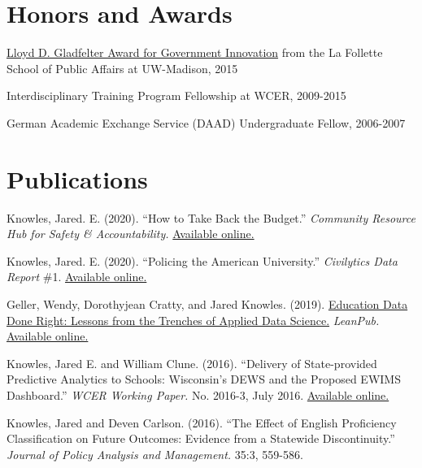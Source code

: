 \documentclass[margin,line]{res}
\begin{document}
\begin{resume}
\section{\sc Honors and Awards} 

\href{https://www.lafollette.wisc.edu/news/2015-gladfelter-winners-announced}{Lloyd D. Gladfelter Award for Government Innovation} from the La Follette School of Public Affairs at UW-Madison, 2015

\vspace*{-2.5mm}

Interdisciplinary Training Program Fellowship at WCER, 2009-2015

\vspace*{-2.5mm}

German Academic Exchange Service (DAAD) Undergraduate Fellow, 2006-2007



\section{\sc Publications}

Knowles, Jared. E. (2020). ``How to Take Back the Budget.'' \emph{Community Resource 
Hub for Safety \& Accountability.} \href{https://communityresourcehub.org/resources/how-to-take-back-the-budget/}{Available online.}

Knowles, Jared. E. (2020). ``Policing the American University.'' \emph{Civilytics 
Data Report} \#1. \href{https://www.civilytics.com/publication/cpd-report/}{Available online.}

Geller, Wendy, Dorothyjean Cratty, and Jared Knowles. (2019). \uline{Education Data Done Right: Lessons from the Trenches of Applied Data Science.} \emph{LeanPub.} 
\href{https://www.eddatadoneright.com}{Available online.}

Knowles, Jared E. and William Clune. (2016). ``Delivery of State-provided Predictive
Analytics to Schools: Wisconsin’s DEWS and the Proposed EWIMS Dashboard.'' 
\emph{WCER Working Paper.} No. 2016-3, July 2016. \href{https://wcer-web.ad.education.wisc.edu/docs/working-papers/Working_Paper_No_2016_03.pdf}{Available online.}

Knowles, Jared and Deven Carlson. (2016). ``The Effect of English Proficiency Classification on Future Outcomes: 
Evidence from a Statewide Discontinuity.'' \emph{Journal of Policy Analysis and Management.}
35:3, 559-586. 


\end{resume}
\end{document}
